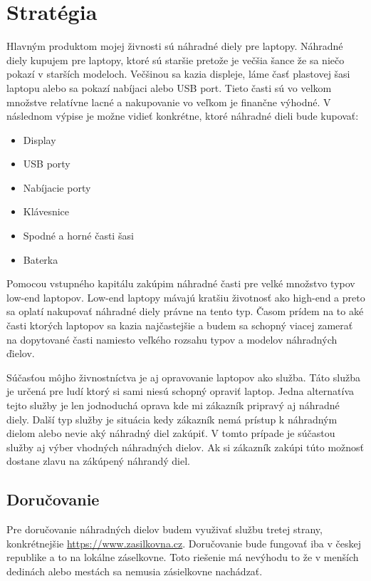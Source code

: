 \chapter{Stratégia}

Hlavným produktom mojej živnosti sú náhradné diely pre laptopy. Náhradné diely kupujem pre laptopy, ktoré sú staršie pretože je večšia šance že sa niečo pokazí v starších modeloch. Večšinou sa kazia displeje, láme časť plastovej šasi laptopu alebo sa pokazí nabíjaci alebo USB port. Tieto časti sú vo velkom množstve relatívne lacné a nakupovanie vo veľkom je finančne výhodné. V následnom výpise je možne vidieť konkrétne, ktoré náhradné dieli bude kupovať:

\begin{itemize}
  \item Display
  \item USB porty
  \item Nabíjacie porty
  \item Klávesnice
  \item Spodné a horné časti šasi
  \item Baterka
\end{itemize}

\medskip

Pomocou vstupného kapitálu zakúpim náhradné časti pre velké množstvo typov low-end laptopov. Low-end laptopy mávajú kratšiu životnosť ako high-end a preto sa oplatí nakupovať náhradné diely právne na tento typ. Časom prídem na to aké časti ktorých laptopov sa kazia najčastejšie a budem sa schopný viacej zamerať na dopytované časti namiesto veľkého rozsahu typov a modelov náhradných ďielov.

Súčasťou môjho živnostníctva je aj opravovanie laptopov ako služba. Táto služba je určená pre ludí ktorý si sami niesú schopný opraviť laptop. Jedna alternatíva tejto služby je len jodnoduchá oprava kde mi zákazník pripravý aj náhradné diely. Další typ služby je situácia kedy zákazník nemá prístup k náhradným dielom alebo nevie aký náhradný diel zakúpiť. V tomto prípade je súčastou služby aj výber vhodných náhradných dielov. Ak si zákazník zakúpi túto možnosť dostane zlavu na zákúpený náhrandý diel.

\section{Doručovanie}

Pre doručovanie náhradných dielov budem využivať službu tretej strany, konkrétnejšie \url{https://www.zasilkovna.cz}. Doručovanie bude fungovať iba v českej republike a to na lokálne záselkovne. Toto riešenie má nevýhodu to že v menších dedinách alebo mestách sa nemusia zásielkovne nachádzať.


